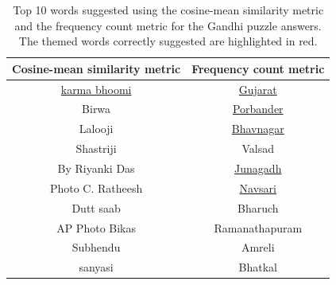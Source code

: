 \documentclass[twoside]{article}
\begin{document}
\begin{table}[h!]
  \begin{center}
    \begin{tabular}{c c}
      \toprule
      \textbf{Cosine-mean similarity metric} & \textbf{Frequency count metric}  \\ 
      \midrule
      \ul{karma bhoomi} & \ul{Gujarat} \\
      Birwa & \ul{Porbander}\\
      Lalooji & \ul{Bhavnagar}\\
      Shastriji & Valsad\\
      By Riyanki Das & \ul{Junagadh}\\
      Photo C. Ratheesh & \ul{Navsari} \\
      Dutt saab & Bharuch \\
      AP Photo Bikas & Ramanathapuram\\
      Subhendu & Amreli \\
      sanyasi & Bhatkal\\
      \bottomrule
    \end{tabular}
     \caption{Top 10 words suggested using the cosine-mean similarity metric and the frequency count metric for the Gandhi puzzle answers. The themed words correctly suggested are highlighted in red.}
    \label{tab:table2}
  \end{center}
\end{table}
\end{document}
